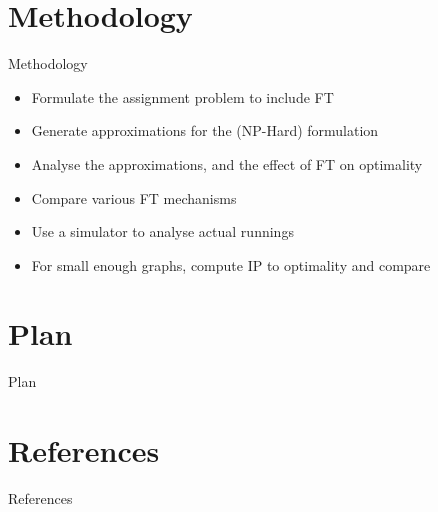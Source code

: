 \documentclass{beamer}
\begin{document}
\section{Methodology}

\begin{frame}{Methodology}
\begin{itemize}
	\item Formulate the assignment problem to include FT
	\item Generate approximations for the (NP-Hard) formulation
	\item Analyse the approximations, and the effect of FT on optimality
	\item Compare various FT mechanisms
	\item Use a simulator to analyse actual runnings
	\item For small enough graphs, compute IP to optimality and compare
\end{itemize}
\end{frame}

\section{Plan}

\begin{frame}{Plan}
\end{frame}

\section{References}

\begin{frame}[allowframebreaks]{References}


\end{frame}
\end{document}
